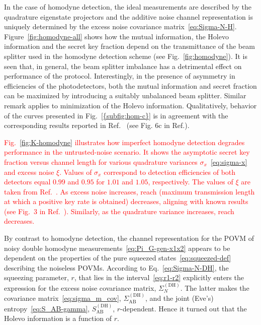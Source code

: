 \documentclass[%
reprint,
superscriptaddress,
 amsmath,amssymb,amsfonts,
 aps,
 pra,
 longbibliography
]{revtex4-2}
\newcommand{\ind}[1]{\mathrm{#1}}
\begin{document}
In the case of homodyne detection, the ideal measurements are described by the quadrature eigenstate
projectors and the additive noise channel representation is uniquely determined by the excess noise
covariance matrix~\eqref{eq:Sigma-N-H}.
Figure~\ref{fig:homodyne-all} shows how the mutual information, the Holevo
information and the secret key fraction depend on the transmittance of the beam splitter used in the
homodyne detection scheme (see Fig.~\ref{fig:homodyne}).
It is seen that, in general, the beam splitter imbalance has a
detrimental effect on performance of the protocol.
Interestingly,
in the presence of asymmetry in efficiencies of the photodetectors,
both the mutual information and secret
fraction can be maximized by introducing
a suitably unbalanced beam splitter.
Similar remark applies to minimization of the Holevo information.
Qualitatively, behavior of the curves presented
in Fig.~\ref{{subfig:hom-c}} is in agreement with
the corresponding results reported in Ref.~\cite{ruiz2023effects} (see Fig. 6c in Ref.).

\textcolor{red}{Fig.~\ref{fig:K-homodyne} illustrates how imperfect homodyne detection degrades performance in the untrusted-noise scenario. It shows the asymptotic secret key fraction versus channel length for various quadrature variances $\sigma_x$~\eqref{eq:sigma-x} and excess noise $\xi$. Values of $\sigma_x$ correspond to detection efficiencies of both detectors equal $0.99$ and $0.95$ for $1.01$ and $1.05$, respectively. The values of $\xi$ are taken from Ref.~\cite{laudenbach2018continuous}. As excess noise increases, reach (maximum transmission length at which a positive key rate is obtained) decreases, aligning with known results (see Fig.~3 in Ref.~\cite{laudenbach2018continuous}). Similarly, as the quadrature variance increases, reach decreases.}

By contrast to homodyne detection,
the channel representation
for the POVM of noisy double homodyne measurements~\eqref{eq:Pi_G-gen-x1x2}
appears to be dependent on the properties
of the pure squeezed states~\eqref{eq:squeezed-def}
describing the noiseless POVMs.
According to Eq.~\eqref{eq:Sigma-N-DH},
the squeezing parameter, $r$,
that lies in the interval~\eqref{eq:r1-r2}
explicitly enters
the expression for the excess noise covariance matrix, $\Sigma_N^{(\ind{DH})}$.
The latter makes the covariance matrix~\eqref{eq:sigma_m_cov},
$\Sigma_{\ind{AB}}^{(\ind{DH})}$,
and the joint (Eve's) entropy~\eqref{eq:S_AB-gamma},
$S_{\ind{AB}}^{(\ind{DH})}$, $r$-dependent.
Hence it turned out that the Holevo information
is a function of $r$.
\end{document}
